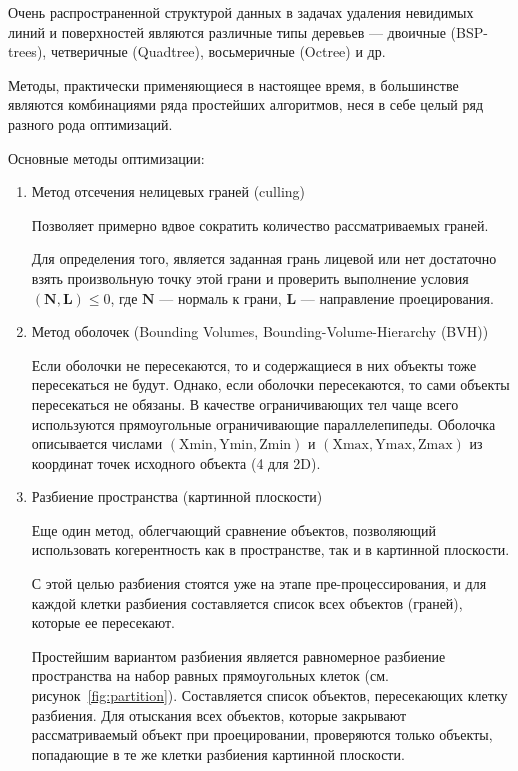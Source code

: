 Очень распространенной структурой данных в задачах удаления невидимых линий и поверхностей являются различные типы деревьев — двоичные (BSP-trees), четверичные (Quadtree), восьмеричные (Octree) и др.

Методы, практически применяющиеся в настоящее время, в большинстве являются комбинациями ряда простейших алгоритмов, неся в себе целый ряд разного рода оптимизаций.~\cite{shishkin}

Основные методы оптимизации:

\begin{enumerate}
	\item Метод отсечения нелицевых граней (culling)
	
Позволяет примерно вдвое сократить количество рассматриваемых граней.

Для определения того, является заданная грань лицевой или нет достаточно взять произвольную точку этой грани и проверить выполнение условия \( ( \mathbf{N}, \mathbf{L} ) \leq 0 \), где \( \mathbf{N} \) — нормаль к грани, \( \mathbf{L} \) — направление проецирования.

	\item Метод оболочек (Bounding Volumes, Bounding-Volume-Hierarchy (BVH))
	
Если оболочки не пересекаются, то и содержащиеся в них объекты тоже пересекаться не будут. Однако, если оболочки пересекаются, то сами объекты пересекаться не обязаны. В качестве ограничивающих тел чаще всего используются прямоугольные ограничивающие параллелепипеды. Оболочка описывается числами \( (\text{Xmin}, \text{Ymin}, \text{Zmin}) \) и \( (\text{Xmax}, \text{Ymax}, \text{Zmax}) \) из координат точек исходного объекта (4 для 2D).

	\item Разбиение пространства (картинной плоскости)
	
Еще один метод, облегчающий сравнение объектов, позволяющий использовать когерентность как в пространстве, так и в картинной плоскости.

С этой целью разбиения стоятся уже на этапе пре-процессирования, и для каждой клетки разбиения составляется список всех объектов (граней), которые ее пересекают.

Простейшим вариантом разбиения является равномерное разбиение
пространства на набор равных прямоугольных клеток (см. рисунок~\ref{fig:partition}). Составляется список объектов, пересекающих клетку разбиения. Для
отыскания всех объектов, которые закрывают рассматриваемый объект
при проецировании, проверяются только объекты, попадающие в те же
клетки разбиения картинной плоскости.


\end{enumerate}
